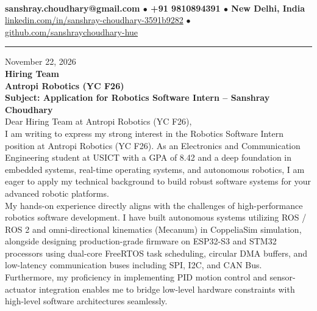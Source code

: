 \documentclass[10pt,a4paper]{article}%
\begin{document}
%
 \vspace{3pt}\\%
\noindent \textbf{\footnotesize sanshray.choudhary@gmail.com $\bullet$ +91 9810894391 $\bullet$ New Delhi, India}\\%
\noindent \href{https://www.linkedin.com/in/sanshray-choudhary-3591b9282}{linkedin.com/in/sanshray-choudhary-3591b9282} $\bullet$ \href{https://github.com/sanshraychoudhary-hue}{github.com/sanshraychoudhary-hue} \vspace{12pt}%
\hrule \vspace{18pt}%

\noindent November 22, 2026 \vspace{12pt}\\%
\noindent \textbf{Hiring Team} \\%
\noindent \textbf{Antropi Robotics (YC F26)} \vspace{16pt}\\%

\noindent \textbf{Subject: Application for Robotics Software Intern -- Sanshray Choudhary} \vspace{12pt}\\%

\noindent Dear Hiring Team at Antropi Robotics (YC F26), \vspace{8pt}\\%

\noindent I am writing to express my strong interest in the Robotics Software Intern position at Antropi Robotics (YC F26). As an Electronics and Communication Engineering student at USICT with a GPA of 8.42 and a deep foundation in embedded systems, real-time operating systems, and autonomous robotics, I am eager to apply my technical background to build robust software systems for your advanced robotic platforms. \vspace{8pt}\\

\noindent My hands-on experience directly aligns with the challenges of high-performance robotics software development. I have built autonomous systems utilizing ROS / ROS 2 and omni-directional kinematics (Mecanum) in CoppeliaSim simulation, alongside designing production-grade firmware on ESP32-S3 and STM32 processors using dual-core FreeRTOS task scheduling, circular DMA buffers, and low-latency communication buses including SPI, I2C, and CAN Bus. Furthermore, my proficiency in implementing PID motion control and sensor-actuator integration enables me to bridge low-level hardware constraints with high-level software architectures seamlessly. \vspace{8pt}\\
\end{document}
